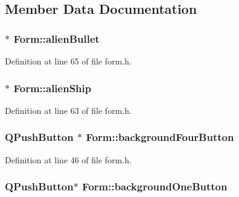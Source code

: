 \subsection{Member Data Documentation}
\hypertarget{class_form_aeacd1539514074613bf55a46da8680c9}{
\subsubsection[{alienBullet}]{$\ast$ {\bf Form::alienBullet}}}
\label{class_form_aeacd1539514074613bf55a46da8680c9}


Definition at line 65 of file form.h.\hypertarget{class_form_a65c28753832fba6be96e0a48396b5c9b}{
\subsubsection[{alienShip}]{$\ast$ {\bf Form::alienShip}}}
\label{class_form_a65c28753832fba6be96e0a48396b5c9b}


Definition at line 63 of file form.h.\hypertarget{class_form_a8457205717f75aacbf589e2bae555f5e}{
\subsubsection[{backgroundFourButton}]{\setlength{\rightskip}{0pt plus 5cm}QPushButton $\ast$ {\bf Form::backgroundFourButton}}}
\label{class_form_a8457205717f75aacbf589e2bae555f5e}


Definition at line 46 of file form.h.\hypertarget{class_form_ae5c82e727fbfccafdcc407c86dc93d7a}{
\subsubsection[{backgroundOneButton}]{\setlength{\rightskip}{0pt plus 5cm}QPushButton$\ast$ {\bf Form::backgroundOneButton}}}
\label{class_form_ae5c82e727fbfccafdcc407c86dc93d7a}


